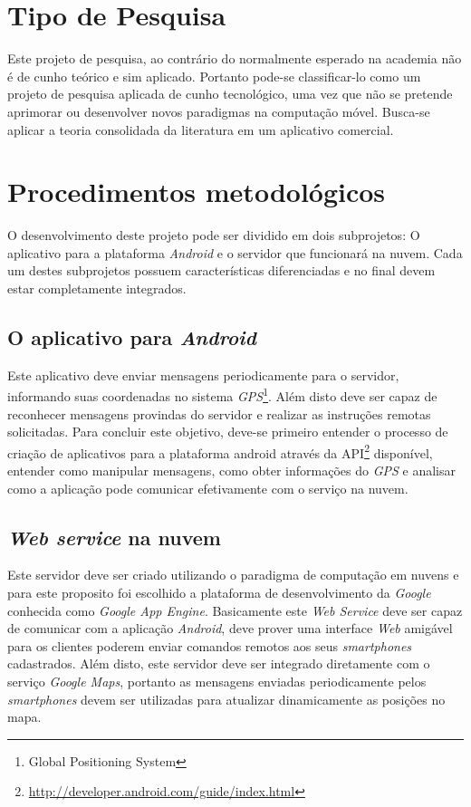 
\section{Tipo de Pesquisa}
Este projeto de pesquisa, ao contrário do normalmente esperado na academia não é de cunho teórico e
sim aplicado. Portanto pode-se classificar-lo como um projeto de pesquisa aplicada de cunho
tecnológico, uma vez que não se pretende aprimorar ou desenvolver novos paradigmas na computação
móvel. Busca-se aplicar a teoria consolidada da literatura em um aplicativo comercial.

\section{Procedimentos metodológicos}
O desenvolvimento deste projeto pode ser dividido em dois subprojetos: O aplicativo para a plataforma
\emph{Android} e o servidor que funcionará na nuvem. Cada um destes subprojetos possuem
características diferenciadas e no final devem estar completamente integrados.\\

\subsection{O aplicativo para \emph{Android}}
Este aplicativo deve enviar mensagens periodicamente para o servidor, informando suas
coordenadas no sistema \emph{GPS}\footnote{Global Positioning System}. Além disto deve ser capaz de
reconhecer mensagens provindas do servidor e realizar as instruções remotas solicitadas. Para
concluir este objetivo, deve-se primeiro entender o processo de criação de aplicativos para a
plataforma android através da API\footnote{\url{http://developer.android.com/guide/index.html}}
disponível, entender
como manipular mensagens, como obter informações do \emph{GPS} e analisar como a aplicação pode comunicar efetivamente com
o serviço na nuvem. 

\subsection{\emph{Web service} na nuvem}
Este servidor deve ser criado utilizando o paradigma de computação em nuvens e para este proposito
foi escolhido a plataforma de desenvolvimento da \emph{Google} conhecida como \emph{Google App
Engine}. Basicamente este \emph{Web Service} deve ser capaz de comunicar com a aplicação
\emph{Android}, deve prover uma interface \emph{Web} amigável para os clientes poderem enviar
comandos remotos aos seus \emph{smartphones} cadastrados. Além disto, este servidor deve ser integrado diretamente com o serviço \emph{Google Maps}, portanto as 
mensagens enviadas periodicamente pelos \emph{smartphones} devem ser utilizadas para atualizar
dinamicamente as posições no mapa.\\ 

